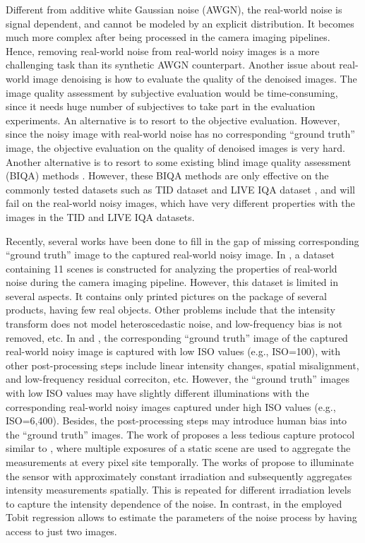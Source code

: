 Different from additive white Gaussian noise (AWGN), the real-world noise is signal dependent, and cannot be modeled by an explicit distribution. It becomes much more complex after being processed in the camera imaging pipelines. Hence, removing real-world noise from real-world noisy images is a more challenging task than its synthetic AWGN counterpart. Another issue about real-world image denoising is how to evaluate the quality of the denoised images. The image quality assessment by subjective evaluation would be time-consuming, since it needs huge number of subjectives to take part in the evaluation experiments. An alternative is to resort to the objective evaluation. However, since the noisy image with real-world noise has no corresponding ``ground truth'' image, the objective evaluation on the quality of denoised images is very hard. Another alternative is to resort to some existing blind image quality assessment (BIQA) methods \cite{bliinds,biqi}. However, these BIQA methods are only effective on the commonly tested datasets such as TID dataset \cite{tid2008} and LIVE IQA dataset \cite{LIVEIQA}, and will fail on the real-world noisy images, which have very different properties with the images in the TID \cite{tid2008} and LIVE IQA \cite{LIVEIQA} datasets.

Recently, several works have been done to fill in the gap of missing corresponding ``ground truth'' image to the captured real-world noisy image. In \cite{crosschannel2016}, a dataset containing 11 scenes is constructed for analyzing the properties of real-world noise during the camera imaging pipeline. However, this dataset is limited in several aspects. It contains only printed pictures on the package of several products, having few real objects. Other problems include that the intensity transform does not model heteroscedastic noise, and low-frequency bias is not removed, etc. In \cite{RENOIR2014} and \cite{dnd2017}, the corresponding ``ground truth'' image of the captured real-world noisy image is captured with low ISO values (e.g., ISO=100), with other post-processing steps include linear intensity changes, spatial misalignment, and low-frequency residual correciton, etc. However, the ``ground truth'' images with low ISO values may have slightly different illuminations with the corresponding real-world noisy images captured under high ISO values (e.g., ISO=6,400). Besides, the post-processing steps may introduce human bias into the ``ground truth'' images. The work of \cite{EMVA1288} proposes a less tedious capture protocol similar to \cite{dnd2017}, where multiple exposures of a static scene are used to aggregate the measurements at every pixel site temporally. The works of \cite{noisemeasurement,moldovan2006denoising} propose to illuminate the sensor with approximately constant irradiation and subsequently aggregates intensity measurements spatially. This is repeated for different irradiation levels to capture the intensity dependence of the noise. In contrast, in \cite{dnd2017} the employed Tobit regression allows to estimate the parameters of the noise process by having access to just two images.


